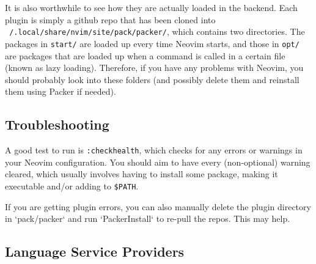   It is also worthwhile to see how they are actually loaded in the backend. Each plugin is simply a github repo that has been cloned into \texttt{~/.local/share/nvim/site/pack/packer/}, which contains two directories. The packages in \texttt{start/} are loaded up every time Neovim starts, and those in \texttt{opt/} are packages that are loaded up when a command is called in a certain file (known as lazy loading). Therefore, if you have any problems with Neovim, you should probably look into these folders (and possibly delete them and reinstall them using Packer if needed).

\subsection{Troubleshooting}

  A good test to run is \texttt{:checkhealth}, which checks for any errors or warnings in your Neovim configuration. You should aim to have every (non-optional) warning cleared, which usually involves having to install some package, making it executable and/or adding to \texttt{\$PATH}. 

  If you are getting plugin errors, you can also manually delete the plugin directory in `pack/packer` and run `PackerInstall` to re-pull the repos. This may help. 

\subsection{Language Service Providers} 

